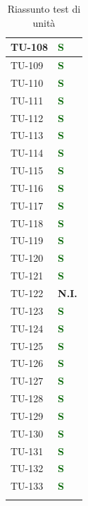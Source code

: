 \begin{longtable}{|C{2.5cm}|C{2.5cm}|}
	\hline
	{TU-108} & \textcolor{darkgreen}{\textbf{S}}\\
	\hline
	{TU-109} & \textcolor{darkgreen}{\textbf{S}}\\
	\hline
	{TU-110} & \textcolor{darkgreen}{\textbf{S}}\\
	\hline
	{TU-111} & \textcolor{darkgreen}{\textbf{S}}\\
	\hline
	{TU-112} & \textcolor{darkgreen}{\textbf{S}}\\
	\hline
	{TU-113} & \textcolor{darkgreen}{\textbf{S}}\\
	\hline
	{TU-114} & \textcolor{darkgreen}{\textbf{S}}\\
	\hline
	{TU-115} & \textcolor{darkgreen}{\textbf{S}}\\
	\hline
	{TU-116} & \textcolor{darkgreen}{\textbf{S}}\\
	\hline
	{TU-117} & \textcolor{darkgreen}{\textbf{S}}\\
	\hline
	{TU-118} & \textcolor{darkgreen}{\textbf{S}}\\
	\hline
	{TU-119} & \textcolor{darkgreen}{\textbf{S}}\\
	\hline
	{TU-120} & \textcolor{darkgreen}{\textbf{S}}\\
	\hline
	{TU-121} & \textcolor{darkgreen}{\textbf{S}}\\
	\hline
	{TU-122} & {\textbf{N.I.}}\\
	\hline
	{TU-123} & \textcolor{darkgreen}{\textbf{S}}\\
	\hline
	{TU-124} & \textcolor{darkgreen}{\textbf{S}}\\
	\hline
	{TU-125} & \textcolor{darkgreen}{\textbf{S}}\\
	\hline
	{TU-126} & \textcolor{darkgreen}{\textbf{S}}\\
	\hline
	{TU-127} & \textcolor{darkgreen}{\textbf{S}}\\
	\hline
	{TU-128} & \textcolor{darkgreen}{\textbf{S}}\\
	\hline
	{TU-129} & \textcolor{darkgreen}{\textbf{S}}\\
	\hline
	{TU-130} & \textcolor{darkgreen}{\textbf{S}}\\
	\hline
	{TU-131} & \textcolor{darkgreen}{\textbf{S}}\\
	\hline
	{TU-132} & \textcolor{darkgreen}{\textbf{S}}\\
	\hline
	{TU-133} & \textcolor{darkgreen}{\textbf{S}}\\
	\hline
	\caption{Riassunto test di unità}
	\label{tabella:riassunto tu}
\end{longtable}
